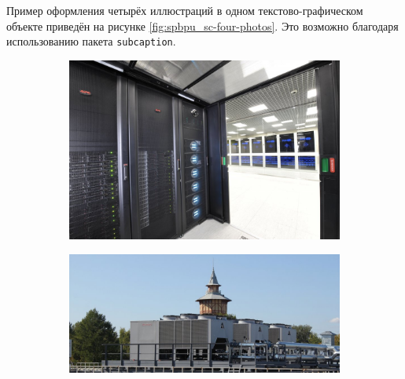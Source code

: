 Пример оформления четырёх иллюстраций в одном текстово-графическом объекте приведён на рисунке \ref{fig:spbpu_sc-four-photos}. Это возможно благодаря использованию пакета \verb|subcaption|.

\begin{figure}[ht]
	\begin{subfigure}[t]{\dimexpr.5\linewidth-1.3em\relax}
		\centering
		\includegraphics[width=.95\linewidth,valign=t]{my_folder/images/spbpu_sc_system}
	\end{subfigure}
\hfill %
	\begin{subfigure}[t]{\dimexpr.5\linewidth-1.3em\relax}
		\centering
		\includegraphics[width=.95\linewidth,valign=t]{my_folder/images/spbpu_sc_refr}
	\end{subfigure}
\\[20pt]
\begin{subfigure}[t]{\dimexpr.5\linewidth-1.3em\relax}
	\centering

\end{subfigure}
\end{figure}
